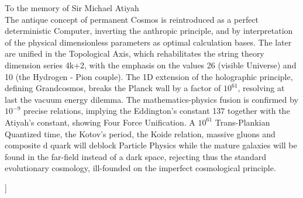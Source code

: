 \documentclass[twoside,draft]{article}
\begin{document}
\begin{sloppypar}
\begin{center}
{}\par
\medskip
{\small\parbox{11cm}{%
\hfill To the memory of Sir Michael Atiyah\\
The antique concept of permanent Cosmos is reintroduced as a perfect deterministic Computer, inverting the anthropic principle, and by interpretation of the physical dimensionless parameters as optimal calculation bases. The later are unified in the Topological Axis, which rehabilitates the string theory dimension series 4k+2, with the emphasis on the values 26 (visible Universe) and 10 (the Hydrogen - Pion couple). The 1D extension of the holographic principle, defining Grandcosmos, breaks the Planck wall by a factor of $10^{61}$, resolving at last the vacuum energy dilemma. 
The mathematics-physics fusion is confirmed by $10^{-9}$ precise relations, implying the Eddington's constant 137 together with  the Atiyah's constant, showing Four Force Unification. A $10^{61}$ Trans-Plankian Quantized time, the Kotov's period, the Koide relation, massive gluons and composite d quark will deblock Particle Physics while the mature galaxies will be found in the far-field instead of a dark space, rejecting thus the standard evolutionary cosmology, ill-founded on the imperfect cosmological principle.

}}\smallskip
\end{center}]{%


\setcounter{section}{0}
\setcounter{equation}{0}
\setcounter{figure}{0}
\setcounter{table}{0}
\setcounter{page}{1}



}
\end{sloppypar}
\end{document}
